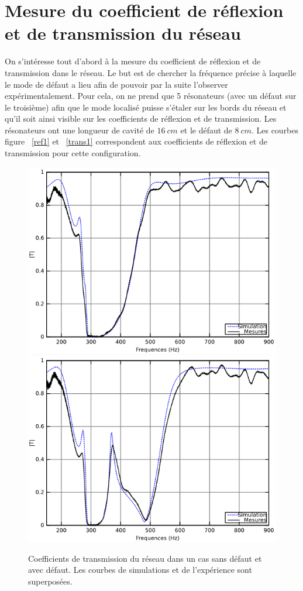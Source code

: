 \section{Mesure du coefficient de réflexion et de transmission du réseau}
On s'intéresse tout d'abord à la mesure du coefficient de réflexion et de transmission dans le réseau. Le but est de chercher la fréquence précise à laquelle le mode de défaut a lieu afin de pouvoir par la suite l'observer expérimentalement. Pour cela, on ne prend que 5 résonateurs (avec un défaut sur le troisième) afin que le mode localisé puisse s'étaler sur les bords du réseau et qu'il soit ainsi visible sur les coefficients de réflexion et de transmission. Les résonateurs ont une longueur de cavité de $16~cm$ et le défaut de $8~cm$. Les courbes figure ~\ref{ref1} et ~\ref{trans1} correspondent aux coefficients de réflexion et de transmission pour cette configuration.

\begin{figure}[!h]
\centering
\includegraphics[scale=0.4]{images_chp3/5HR165_nodefect.png}\hfill
\includegraphics[scale=0.4]{images_chp3/5HR165_8cm_pos3.png}
\caption{\label{ref_trans1} Coefficients de transmission du réseau dans un cas sans défaut et avec défaut. Les courbes de simulations et de l’expérience sont superposées.}
\end{figure}

